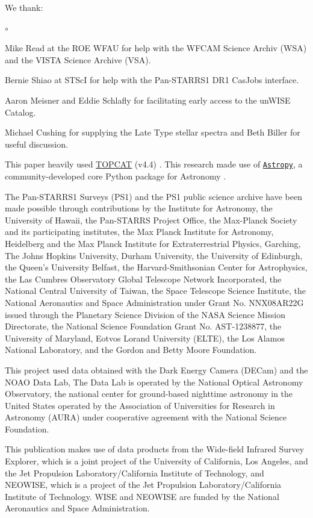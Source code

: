 \documentclass[usenatbib]{mnras}
\begin{document}
We thank:
\begin{list}{$\circ$}{}  
\item Mike Read at the ROE WFAU for help with the WFCAM Science Archiv (WSA) and the VISTA Science Archive (VSA). 
\item Bernie Shiao at STScI for help with the Pan-STARRS1 DR1 CasJobs interface. 
\item Aaron Meisner and Eddie Schlafly for facilitating early access to the unWISE Catalog. 
\item Michael Cushing for supplying the Late Type stellar spectra and Beth Biller for useful discussion. 
\end{list}


This paper heavily used \href{http://www.star.bris.ac.uk/~mbt/topcat/}{TOPCAT} (v4.4)
\citep[][]{Taylor2005, Taylor2011}.
This research made use of \href{http://www.astropy.org}{\tt Astropy}, 
a community-developed core Python package for Astronomy 
\citep{AstropyCollaboration2013, AstropyCollaboration2018}. 

The Pan-STARRS1 Surveys (PS1) and the PS1 public science archive have
been made possible through contributions by the Institute for
Astronomy, the University of Hawaii, the Pan-STARRS Project Office,
the Max-Planck Society and its participating institutes, the Max
Planck Institute for Astronomy, Heidelberg and the Max Planck
Institute for Extraterrestrial Physics, Garching, The Johns Hopkins
University, Durham University, the University of Edinburgh, the
Queen's University Belfast, the Harvard-Smithsonian Center for
Astrophysics, the Las Cumbres Observatory Global Telescope Network
Incorporated, the National Central University of Taiwan, the Space
Telescope Science Institute, the National Aeronautics and Space
Administration under Grant No. NNX08AR22G issued through the Planetary
Science Division of the NASA Science Mission Directorate, the National
Science Foundation Grant No. AST-1238877, the University of Maryland,
Eotvos Lorand University (ELTE), the Los Alamos National Laboratory,
and the Gordon and Betty Moore Foundation.

This project used data obtained with the Dark Energy Camera (DECam)
and the NOAO Data Lab, The Data Lab is operated by the National
Optical Astronomy Observatory, the national center for ground-based
nighttime astronomy in the United States operated by the Association
of Universities for Research in Astronomy (AURA) under cooperative
agreement with the National Science Foundation.

This publication makes use of data products from the Wide-field
Infrared Survey Explorer, which is a joint project of the University
of California, Los Angeles, and the Jet Propulsion
Laboratory/California Institute of Technology, and NEOWISE, which is a
project of the Jet Propulsion Laboratory/California Institute of
Technology. WISE and NEOWISE are funded by the National Aeronautics
and Space Administration.
\end{document}
